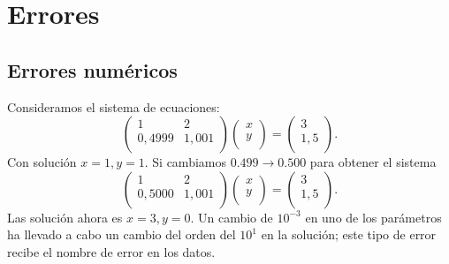 \chapter{Errores}

\section{Errores numéricos}
	
\begin{example}\label{ej:1_errores}
    Consideramos el sistema de ecuaciones:
    \[
        \begin{pmatrix}
            1 & 2\\
            0,4999 & 1,001\\
        \end{pmatrix}
        \begin{pmatrix}
        x\\
        y\\
        \end{pmatrix} =
        \begin{pmatrix}
        3\\
        1,5\\
        \end{pmatrix}.
    \]
    Con solución $x = 1, y = 1$. Si cambiamos $0.499 \rightarrow 0.500$ para obtener el sistema
    \[
        \begin{pmatrix}
            1 & 2\\
            0,5000 & 1,001\\
        \end{pmatrix}
        \begin{pmatrix}
        x\\
        y\\
        \end{pmatrix} =
        \begin{pmatrix}
        3\\
        1,5\\
        \end{pmatrix}.
    \]
    Las solución ahora es $x = 3, y = 0$. Un cambio de $10^{-3}$ en uno de los parámetros ha llevado a cabo un cambio del orden del $10^1$ en la solución; este tipo de error recibe el nombre de error en los datos.
\end{example}

